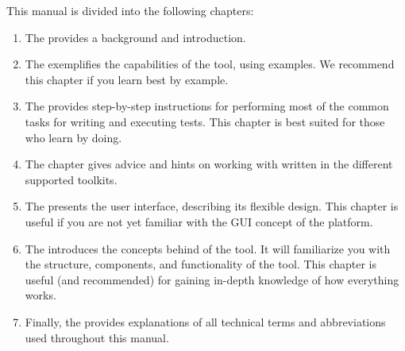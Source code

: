 This manual is divided into the following chapters:

\begin{enumerate}
\item The  provides a background and introduction.

\item The   exemplifies the capabilities of the tool, using  \gdproject{} examples.
We recommend this chapter if you learn best by example. 

\item The  provides step-by-step instructions for performing most of the common tasks for writing and executing tests.
This chapter is best suited for those who learn by doing.

\item The  chapter  gives advice and hints on working with \gdauts{} written in the different supported toolkits.

\item The  presents the user interface, describing its flexible design.
This chapter is useful if you are not yet familiar  with the GUI concept of the  platform.

\item The  introduces the concepts behind of the tool. It will familiarize you with the structure, components, and functionality of the tool. This chapter is useful (and recommended) for gaining in-depth knowledge of how everything works.


\item Finally, the  provides explanations of all
technical terms and abbreviations used throughout this manual.
\end{enumerate}
